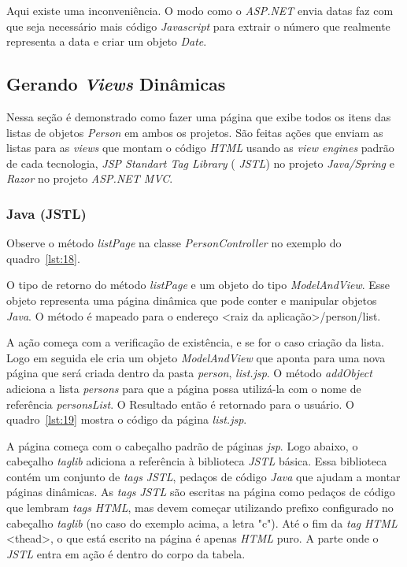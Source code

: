 \documentclass[a4paper,12pt]{article}
\newcommand{\est}[1] {
\textit{#1}}
\newcommand{\classe}[1] {
\textit{#1}}
\newcommand{\arquivo}[1] {
\textit{#1}}
\newcommand{\sigla}[1] {
\textit{#1}}
\newcommand{\lang}[1] {
\textit{#1}}
\newcommand{\metodo}[1] {
\textit{#1}}
\newcommand{\javacode}[3] {
	
}
\newcommand{\jspcode}[3] {
	
}
\begin{document}
Aqui existe uma inconveniência. O modo como o \est{ASP.NET} envia datas faz com que seja necessário mais código \lang{Javascript} para extrair o número que realmente representa a data e criar um objeto \classe{Date}.

\subsection{Gerando \est{Views} Dinâmicas}

Nessa seção é demonstrado como fazer uma página que exibe todos os itens das listas de objetos \classe{Person} em ambos os projetos. São feitas ações que enviam as listas para as \est{views} que montam o código \sigla{HTML} usando as \est{view engines} padrão de cada tecnologia, \est{JSP Standart Tag Library} (\sigla{JSTL}) no projeto \est{Java/Spring} e \est{Razor} no projeto \est{ASP.NET MVC}.

\subsubsection{Java (JSTL)}

Observe o método \metodo{listPage} na classe \classe{PersonController} no exemplo do quadro~\ref{lst:18}.

\javacode{code/18.txt}{Ação no projeto \lang{Java} que retorna uma página com a lista de \classe{Persons}}{lst:18}

O tipo de retorno do método \metodo{listPage} e um objeto do tipo \classe{ModelAndView}. Esse objeto representa uma página dinâmica que pode conter e manipular objetos \lang{Java}. O método é mapeado para o endereço <raiz da aplicação>/person/list. 

A ação começa com a verificação de existência, e se for o caso criação da lista. Logo em seguida ele cria um objeto \classe{ModelAndView} que aponta para uma nova página que será criada dentro da pasta \est{person}, \arquivo{list.jsp}. O método \metodo{addObject} adiciona a lista \est{persons} para que a página possa utilizá-la com o nome de referência \est{personsList}. O Resultado então é retornado para o usuário. O quadro~\ref{lst:19} mostra o código da página \arquivo{list.jsp}.

\jspcode{code/19.txt}{Código da página \arquivo{list.jsp}}{lst:19}

A página começa com o cabeçalho padrão de páginas \est{jsp}. Logo abaixo, o cabeçalho \est{taglib} adiciona a referência à biblioteca \sigla{JSTL} básica. Essa biblioteca contém um conjunto de \est{tags} \sigla{JSTL}, pedaços de código \lang{Java} que ajudam a montar páginas dinâmicas. As \est{tags} \sigla{JSTL} são escritas na página como pedaços de código que lembram \est{tags} \lang{HTML}, mas devem começar utilizando prefixo configurado no cabeçalho \est{taglib} (no caso do exemplo acima, a letra "c"). Até o fim da \est{tag} \lang{HTML} <thead>, o que está escrito na página é apenas \lang{HTML} puro. A parte onde o \sigla{JSTL} entra em ação é dentro do corpo da tabela. 
\end{document}
